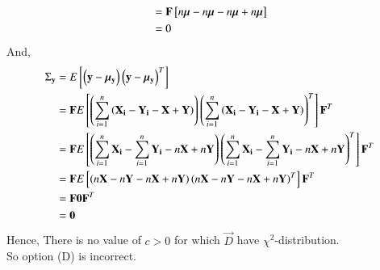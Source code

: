 \documentclass[journal,12pt,onecolumn]{IEEEtran}
\theoremstyle{remark}
\begin{document}
\begin{enumerate}[label=(\alph*)]
\begin{align}
                     &= \mathbf{F}{}\left[n\bm{\mu}-n\bm{\mu}-n\bm{\mu}+n\bm{\mu}\right] \\
                     &= 0
\end{align}
And,
\begin{align}
{\Sigma}_{\mathbf{y}} &= E{}\left[\left(\mathbf{y}-{\bm{\mu}}_{\mathbf{y}}\right){\left(\mathbf{y}-{\bm{\mu}}_{\mathbf{y}}\right)}^T\right] \\
                   &= \mathbf{F}E{}\left[\left(\sum_{i=1}^{n}\left(\mathbf{X_i}-\mathbf{Y_i}-\mathbf{X}+\mathbf{Y}\right)\right){\left(\sum_{i=1}^{n}\left(\mathbf{X_i}-\mathbf{Y_i}-\mathbf{X}+\mathbf{Y}\right)\right)}^T\right]{\mathbf{F}}^T \\
                   &= \mathbf{F}E{}\left[\left(\sum_{i=1}^{n}\mathbf{X_i}-\sum_{i=1}^{n}\mathbf{Y_i}-n\mathbf{X}+n\mathbf{Y}\right){\left(\sum_{i=1}^{n}\mathbf{X_i}-\sum_{i=1}^{n}\mathbf{Y_i}-n\mathbf{X}+n\mathbf{Y}\right)}^T\right]{\mathbf{F}}^T \\
                   &= \mathbf{F}E{}\left[\left(n\mathbf{X}-n\mathbf{Y}-n\mathbf{X}+n\mathbf{Y}\right){\left(n\mathbf{X}-n\mathbf{Y}-n\mathbf{X}+n\mathbf{Y}\right)}^T\right]{\mathbf{F}}^T \\
                   &= \mathbf{F}\bm{0}{\mathbf{F}}^T  \\
                   &= \bm{0} 
\end{align}
Hence, There is no value of $c>0$ for which $\vec{D}$ have ${\chi}^2$-distribution.\\
So option (D) is incorrect.
\end{enumerate}
\end{document}
